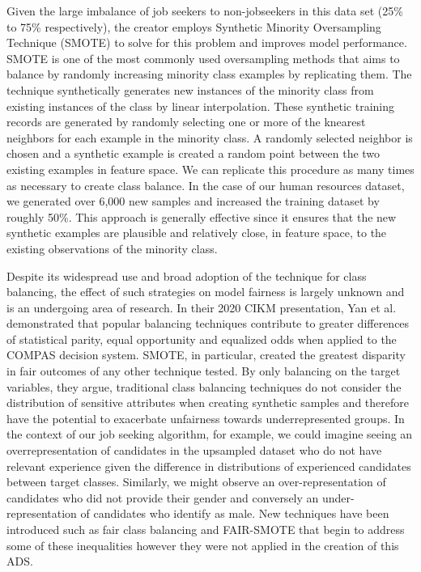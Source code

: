 Given the large imbalance of job seekers to non-jobseekers in this data set (25\% to 75\% respectively), the creator employs Synthetic Minority Oversampling Technique (SMOTE) to solve for this problem and improves model performance.  SMOTE is one of the most commonly used oversampling methods that aims to balance by randomly increasing minority class examples by replicating them. The technique synthetically generates new instances of the minority class from existing instances of the class by linear interpolation.  These synthetic training records are generated by randomly selecting one or more of the k\-nearest neighbors for each example in the minority class.  A randomly selected neighbor is chosen and a synthetic example is created a random point between the two existing examples in feature space.  We can replicate this procedure as many times as necessary to create class balance.  In the case of our human resources dataset, we generated over 6,000 new samples and increased the training dataset by roughly 50\%.
This approach is generally effective since it ensures that the new synthetic examples are plausible and relatively close, in feature space, to the existing observations of the minority class.  

Despite its widespread use and broad adoption of the technique for class balancing, the effect of such strategies on model fairness is largely unknown and is an undergoing area of research. In their 2020 CIKM presentation, Yan et al. demonstrated that popular balancing techniques contribute to greater differences of statistical parity, equal opportunity and equalized odds when applied to the COMPAS decision system. SMOTE, in particular, created the greatest disparity in fair outcomes of any other technique tested. By only balancing on the target variables, they argue, traditional class balancing techniques do not consider the distribution of sensitive attributes when creating synthetic samples and therefore have the potential to exacerbate unfairness towards underrepresented groups. In the context of our job seeking algorithm, for example, we could imagine seeing an over\-representation of candidates in the upsampled dataset who do not have relevant experience given the difference in distributions of experienced candidates between target classes. Similarly, we might observe an over-representation of candidates who did not provide their gender and conversely an under-representation of candidates who identify as male.  New techniques have been introduced such as 
fair class balancing and FAIR-SMOTE that begin to address some of these inequalities however they were not applied in the creation of this ADS.

